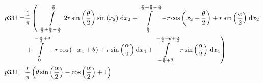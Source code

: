 \begin{align}
    p331 =&\frac{1}{\pi} \left(\;\;\int\limits_{\frac{\pi}{2} + \frac{\theta}{2} - \frac{\alpha}{2}}^{\frac{\pi}{2}}2 r \sin{\left (\frac{\theta}{2} \right )} \sin{\left (x_{2} \right )}\;\mathrm{d}x_{2}+\int\limits_{\frac{\theta}{2}}^{\frac{\pi}{2} + \frac{\theta}{2} - \frac{\alpha}{2}}- r \cos{\left (x_{2} + \frac{\theta}{2} \right )} + r \sin{\left (\frac{\alpha}{2} \right )}\;\mathrm{d}x_{2}\right.\notag\\
 &\left.+\int\limits_{0}^{- \frac{\pi}{2} + \theta}- r \cos{\left (- x_{4} + \theta \right )} + r \sin{\left (\frac{\alpha}{2} \right )}\;\mathrm{d}x_{4}+\int\limits_{- \frac{\pi}{2} + \theta}^{- \frac{\pi}{2} + \theta + \frac{\alpha}{2}}r \sin{\left (\frac{\alpha}{2} \right )}\;\mathrm{d}x_{4}\right)\label{p331Def}\\
    p331 =& \frac{r}{\pi} \left(\theta \sin{\left (\frac{\alpha}{2} \right )} - \cos{\left (\frac{\alpha}{2} \right )} + 1\right)\label{p331Sln}
\end{align}